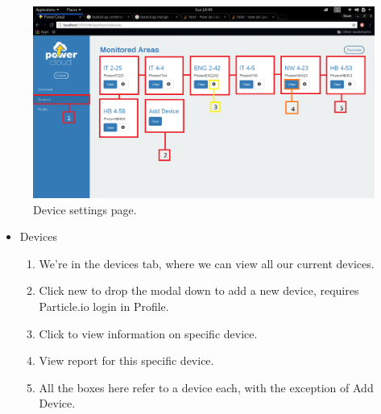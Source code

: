 \documentclass[a4paper,10pt]{article}
\begin{document}
		\begin{figure}[H]
			\includegraphics[width=\textwidth]{images/Devices.png}
			\caption{Device settings page. \label{overflow}}
		\end{figure}
		\begin{itemize}
			\item Devices
			\begin{enumerate}
				\item We're in the devices tab, where we can view all our current devices.
				\item Click new to drop the modal down to add a new device, requires Particle.io login in Profile.
				\item Click to view information on specific device.
				\item View report for this specific device.
				\item All the boxes here refer to a device each, with the exception of Add Device.
			\end{enumerate}
		\end{itemize}
		
\end{document}
